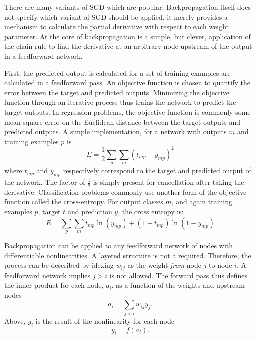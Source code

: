 There are many variants of SGD which are popular.  Backpropagation itself does not specify which variant of SGD should be applied, it merely provides a mechanism to calculate the partial derivative with respect to each weight parameter.  At the core of backpropagation is a simple, but clever, application of the chain rule to find the derivative at an arbitrary node upstream of the output in a feedforward network.

First, the predicted output is calculated for a set of training examples are calculated in a feedforward pass.  An objective function is chosen to quantify the error between the target and predicted outputs.  Minimizing the objective function through an iterative process thus trains the network to predict the target outputs.  In regression problems, the objective function is commonly some mean-square error on the Euclidean distance between the target outputs and predicted outputs.  A simple implementation, for a network with outputs $m$ and training examples $p$ is
\begin{equation} E = \frac12 \sum_p \sum_m (t_{mp} - y_{mp})^2
\label{rmse}
\end{equation}
where $t_{mp}$ and $y_{mp}$ respectively correspond to the target and predicted output of the network.  The factor of $\frac12$ is simply present for cancellation after taking the derivative.  Classification problems commonly use another form of the objective function called the cross-entropy.  For output classes $m$, and again training examples $p$, target $t$ and prediction $y$, the cross entropy is:
\begin{equation}
E = \sum_p \sum_m t_{mp} \ln(y_{mp}) + (1-t_{mp})\ln(1-y_{mp})
\end{equation}

Backpropagation can be applied to any feedforward network of nodes with differentiable nonlinearities.  A layered structure is not a required.  Therefore, the process can be described by idexing $w_{ij}$ as the weight \textit{from} node $j$ to node $i$.  A feedforward network implies $j>i$ is not allowed.  The forward pass thus defines the inner product for each node, $a_i$, as a function of the weights and upstream nodes
\begin{equation}
a_i = \sum_{j<i} w_{ij} y_j.
\end{equation}
Above, $y_i$ is the result of the nonlinearity for each node
\begin{equation}
y_i = f(a_i).
\end{equation}

